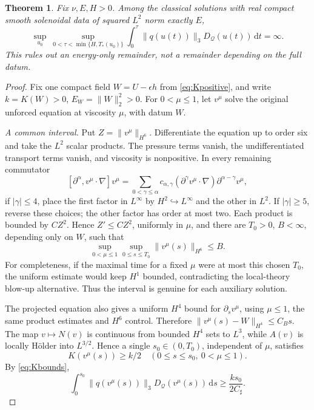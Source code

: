 \documentclass[11pt,a4paper]{article}
\newtheorem{theorem}{Theorem}[section]
\theoremstyle{definition}
\theoremstyle{remark}
\newcommand{\Q}{\mathcal Q}
\newcommand{\dd}{\,\mathrm d}
\newcommand{\norm}[1]{\lVert #1\rVert}
\numberwithin{equation}{section}
\begin{document}
\begin{theorem}\label{thm:Genergy}
Fix \(\nu,E,H>0\). Among the classical solutions with real compact smooth solenoidal data of squared \(L^2\) norm exactly \(E\),
\begin{equation}\label{eq:Ginfinite}
\sup_{u_0}\ \sup_{0<\tau<\min\{H,T_*(u_0)\}}
\int_0^\tau\norm{q(u(t))}_3D_{\Q}(u(t))\dd t=\infty.
\end{equation}
This rules out an energy-only remainder, not a remainder depending on the full datum.
\end{theorem}
\begin{proof}
Fix one compact field \(W=U-\epsilon h\) from \eqref{eq:Kpositive}, and write \(k=K(W)>0\), \(E_W=\norm W_2^2>0\). For \(0<\mu\le1\), let \(v^\mu\) solve the original unforced equation at viscosity \(\mu\), with datum \(W\).

\emph{A common interval.} Put \(Z=\norm{v^\mu}_{H^6}\). Differentiate the equation up to order six and take the \(L^2\) scalar products. The pressure terms vanish, the undifferentiated transport terms vanish, and viscosity is nonpositive. In every remaining commutator
\[
[\partial^\alpha,v^\mu\cdot\nabla]v^\mu
=\sum_{0<\gamma\le\alpha}c_{\alpha,\gamma}
(\partial^\gamma v^\mu\cdot\nabla)\partial^{\alpha-\gamma}v^\mu,
\]
if \(|\gamma|\le4\), place the first factor in \(L^\infty\) by \(H^2\hookrightarrow L^\infty\) and the other in \(L^2\). If \(|\gamma|\ge5\), reverse these choices; the other factor has order at most two. Each product is bounded by \(CZ^2\). Hence \(Z'\le CZ^2\), uniformly in \(\mu\), and there are \(T_0>0\), \(B<\infty\), depending only on \(W\), such that
\[
\sup_{0<\mu\le1}\sup_{0\le s\le T_0}\norm{v^\mu(s)}_{H^6}\le B.
\]
For completeness, if the maximal time for a fixed \(\mu\) were at most this chosen \(T_0\), the uniform estimate would keep \(H^1\) bounded, contradicting the local-theory blow-up alternative. Thus the interval is genuine for each auxiliary solution.

The projected equation also gives a uniform \(H^4\) bound for \(\partial_sv^\mu\), using \(\mu\le1\), the same product estimates and \(H^6\) control. Therefore
\(\norm{v^\mu(s)-W}_{H^4}\le C_Bs\).
The map \(v\mapsto N(v)\) is continuous from bounded \(H^4\) sets to \(L^3\), while \(A(v)\) is locally Hölder into \(L^{3/2}\). Hence a single \(s_0\in(0,T_0)\), independent of \(\mu\), satisfies
\[
K(v^\mu(s))\ge k/2\quad(0\le s\le s_0,
\ 0<\mu\le1).
\]
By \eqref{eq:Kbounds},
\begin{equation}\label{eq:Gbase}
\int_0^{s_0}\norm{q(v^\mu(s))}_3D_{\Q}(v^\mu(s))\dd s
\ge\frac{ks_0}{2C_\sharp}.
\end{equation}


\end{proof}
\end{document}
